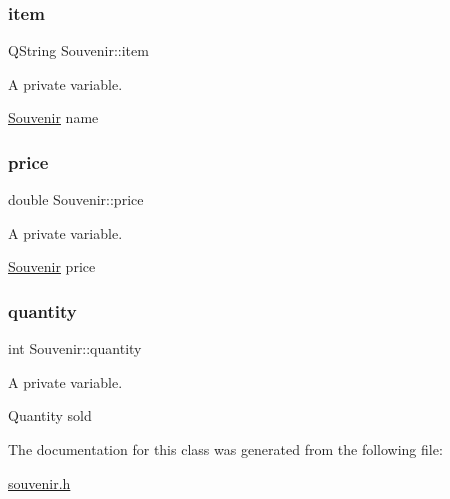 \subsubsection{\texorpdfstring{item}{item}}
{\footnotesize\ttfamily Q\+String Souvenir\+::item\hspace{0.3cm}{\ttfamily [private]}}



A private variable. 

\hyperlink{class_souvenir}{Souvenir} name \mbox{\label{class_souvenir_a2991e814ee69fba3a86d90b7ea48cb2b}} 
\subsubsection{\texorpdfstring{price}{price}}
{\footnotesize\ttfamily double Souvenir\+::price\hspace{0.3cm}{\ttfamily [private]}}



A private variable. 

\hyperlink{class_souvenir}{Souvenir} price \mbox{\label{class_souvenir_a0cf32206e9891435fa2bf609183f8412}} 
\subsubsection{\texorpdfstring{quantity}{quantity}}
{\footnotesize\ttfamily int Souvenir\+::quantity\hspace{0.3cm}{\ttfamily [private]}}



A private variable. 

Quantity sold 

The documentation for this class was generated from the following file\+:\begin{DoxyCompactItemize}
\item 
\hyperlink{souvenir_8h}{souvenir.\+h}\end{DoxyCompactItemize}
